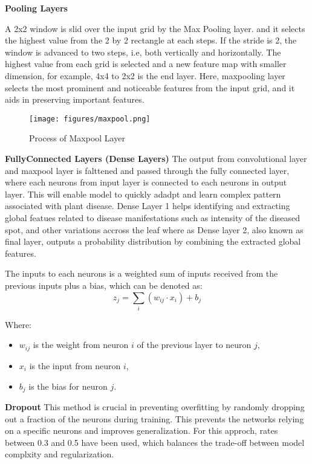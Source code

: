 \textbf{Pooling Layers} 

A 2x2 window is slid over the input grid by the Max Pooling layer. and it selects the highest value from the 2 by 2 rectangle 
at each steps. If the stride is 2, the window is advanced to two steps, i.e, both vertically and horizontally. The highest value 
from each grid is selected and a new feature map with smaller dimension, for example, 4x4 to 2x2 is the end layer. Here, maxpooling 
layer selects the most prominent and noticeable features from the input grid, and it aids in preserving important
features. 

\clearpage
\begin{figure}[h]
    \centering
    \texttt{[image: figures/maxpool.png]}
    \captionsetup{labelsep=colon, justification=centering, labelfont=bf}
    \caption{Process of Maxpool Layer}
\end{figure}


\textbf{FullyConnected Layers (Dense Layers)}
The output from convolutional layer and maxpool layer is falttened and passed through the fully connected layer, where each neurons
from input layer is connected to each neurons in output layer. This will enable model to quickly adadpt and learn complex pattern 
associated with plant disease. Dense Layer 1 helps identifying and extracting global featues related to disease manifestations
such as intensity of the diseased spot, and other variations accross the leaf where as Dense layer 2, also known as final layer, 
outputs a probability distribution by combining the extracted global features.

The inputs to each neurons is a weighted sum of inputs received from the previous inputs plus a bias, which can be denoted as:
\begin{equation}
    z_j = \sum_{i} (w_{ij} \cdot x_i) + b_j
\end{equation}

Where:
\begin{itemize}
  \item $w_{ij}$ is the weight from neuron $i$ of the previous layer to neuron $j$,
  \item $x_i$ is the input from neuron $i$,
  \item $b_j$ is the bias for neuron $j$.
\end{itemize}


\textbf{Dropout}
This method is crucial in preventing overfitting by randomly dropping out a fraction of the neurons during training. This prevents
the networks relying on a specific neurons and improves generalization. For this approch, rates between 0.3 and 0.5 have been used, which 
balances the trade-off between model complxity and regularization. 


